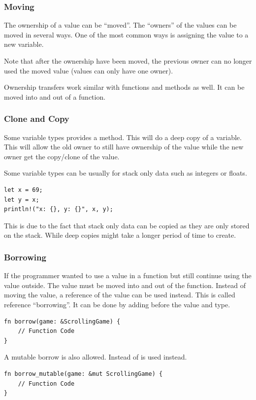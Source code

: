 \documentclass{beamer}
\begin{document}
\begin{frame}[allowframebreaks]
  \frametitle{Moving}
  The ownership of a value can be ``moved''. The ``owners'' of the values can be moved in several ways. One of the most common ways is assigning the value to a new variable.

  

  \alert{Note} that after the ownership have been moved, the previous owner can no longer used the moved value (values can only have one owner).

  \pagebreak

  Ownership transfers work similar with functions and methods as well. It can be moved into and out of a function.
  
  

  \pagebreak
  
\end{frame}

\begin{frame}[fragile]
  \frametitle{Clone and Copy}
  Some variable types provides a  method. This will do a deep copy of a variable. This will allow the old owner to still have ownership of the value while the new owner get the copy/clone of the value.

  Some variable types can be  usually for stack only data such as integers or floats.
\begin{lstlisting}
let x = 69;
let y = x;
println!("x: {}, y: {}", x, y);
\end{lstlisting}
  This is due to the fact that stack only data can be copied as they are only stored on the stack. While deep copies might take a longer period of time to create.
\end{frame}

\begin{frame}[fragile]
  \frametitle{Borrowing}
  If the programmer wanted to use a value in a function but still continue using the value outside. The value must be moved into and out of the function. Instead of moving the value, a reference of the value can be used instead. This is called reference ``borrowing''. It can be done by adding \inlinecode{\&} before the value and type.
\begin{lstlisting}
fn borrow(game: &ScrollingGame) {
    // Function Code
}
\end{lstlisting}

  A mutable borrow is also allowed. Instead of \inlinecode{\&}  is used instead.
\begin{lstlisting}
fn borrow_mutable(game: &mut ScrollingGame) {
    // Function Code
}
\end{lstlisting}
\end{frame}
\end{document}
